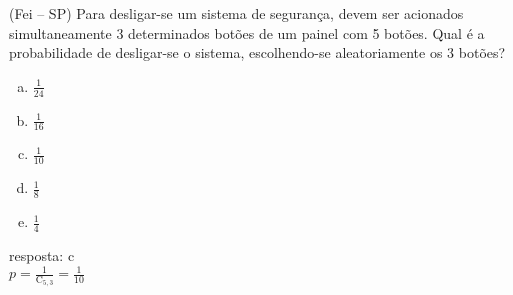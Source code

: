 \begin{ex}
(Fei – SP) Para desligar-se um sistema de segurança, devem ser acionados simultaneamente 3 determinados botões de um painel com 5 botões.  Qual é a probabilidade de desligar-se o sistema, escolhendo-se aleatoriamente os 3 botões? 
   \begin{enumerate}[(a)]
   \item $\frac{1}{24}$
   \item $\frac{1}{16}$
   \item $\frac{1}{10}$
   \item $\frac{1}{8}$
   \item $\frac{1}{4}$
   \end{enumerate}
    \begin{sol}
      resposta: c\\
      $p=\frac{1}{\mathrm{C}_{5,3}}=\frac{1}{10}$
    \end{sol}
\end{ex}